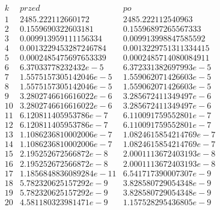 $$
\begin{array}{c|c|c|c|c}
k & przed & po\\
\hline
1 & 2485.222112660172 & 2485.222112540963\\
2 & 0.1559690322603181 & 0.15596897265567333\\
3 & 0.009913959111156334 & 0.009913998847585592\\
4 & 0.0013229453287246784 & 0.0013229751311334415\\
5 & 0.0002485475697653339 & 0.0002485714080084911\\
6 & 6.37033778232432e-5 & 6.372331382697993e-5\\
7 & 1.5575157305142046e-5 & 1.559062071426603e-5\\
8 & 1.5575157305142046e-5 & 1.559062071426603e-5\\
9 & 3.2802746616616022e-6 & 3.285672411349497e-6\\
10 & 3.2802746616616022e-6 & 3.285672411349497e-6\\
11 & 6.120811405953786e-7 & 6.110091759552801e-7\\
12 & 6.120811405953786e-7 & 6.110091759552801e-7\\
13 & 1.1086236810002006e-7 & 1.0824615854214769e-7\\
14 & 1.1086236810002006e-7 & 1.0824615854214769e-7\\
15 & 2.195252672566872e-8 & 2.0001113672403193e-8\\
16 & 2.195252672566872e-8 & 2.0001113672403193e-8\\
17 & 1.1856848836089284e-11 & 6.541717390007307e-9\\
18 & 5.782320625157292e-9 & 3.828580729054348e-9\\
19 & 5.782320625157292e-9 & 3.828580729054348e-9\\
20 & 4.581180323981471e-9 & 1.157528295436805e-9\\
\end{array}
$$
